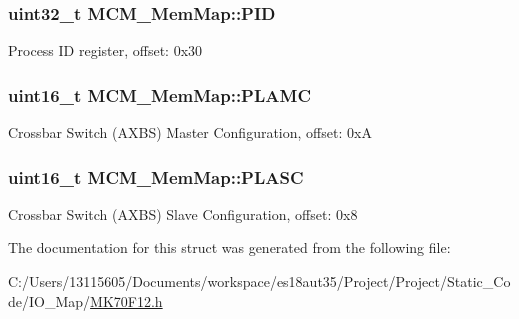 \subsubsection[{P\+I\+D}]{\setlength{\rightskip}{0pt plus 5cm}uint32\+\_\+t M\+C\+M\+\_\+\+Mem\+Map\+::\+P\+I\+D}\label{struct_m_c_m___mem_map_a41b1890f596f706bcd94c2d49c1e44f7}
Process I\+D register, offset\+: 0x30 \hypertarget{struct_m_c_m___mem_map_a7d749b910777a6b67ea94f2379c628ee}{}
\subsubsection[{P\+L\+A\+M\+C}]{\setlength{\rightskip}{0pt plus 5cm}uint16\+\_\+t M\+C\+M\+\_\+\+Mem\+Map\+::\+P\+L\+A\+M\+C}\label{struct_m_c_m___mem_map_a7d749b910777a6b67ea94f2379c628ee}
Crossbar Switch (A\+X\+B\+S) Master Configuration, offset\+: 0x\+A \hypertarget{struct_m_c_m___mem_map_ad68f64d82524bb0b181a837967b8e248}{}
\subsubsection[{P\+L\+A\+S\+C}]{\setlength{\rightskip}{0pt plus 5cm}uint16\+\_\+t M\+C\+M\+\_\+\+Mem\+Map\+::\+P\+L\+A\+S\+C}\label{struct_m_c_m___mem_map_ad68f64d82524bb0b181a837967b8e248}
Crossbar Switch (A\+X\+B\+S) Slave Configuration, offset\+: 0x8 

The documentation for this struct was generated from the following file\+:\begin{DoxyCompactItemize}
\item 
C\+:/\+Users/13115605/\+Documents/workspace/es18aut35/\+Project/\+Project/\+Static\+\_\+\+Code/\+I\+O\+\_\+\+Map/\hyperlink{_m_k70_f12_8h}{M\+K70\+F12.\+h}\end{DoxyCompactItemize}
